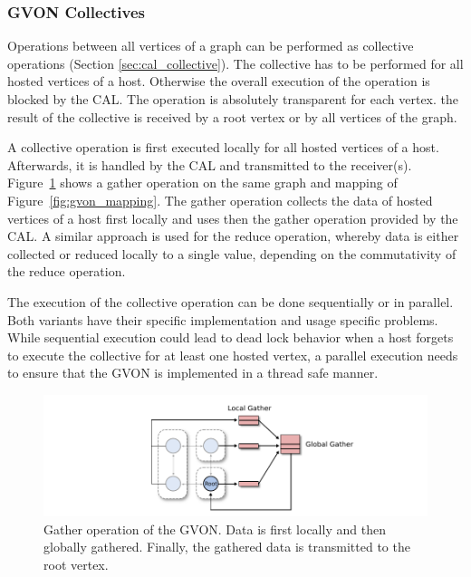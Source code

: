 \subsubsection*{GVON Collectives}
Operations between all vertices of a graph can be performed as
collective operations (Section \ref{sec:cal_collective}).  The
collective has to be performed for all hosted vertices of a
host. Otherwise the overall execution of the operation is blocked by
the CAL. The operation is absolutely transparent for each vertex.  the
result of the collective is received by a root vertex or by all
vertices of the graph.

A collective operation is first executed locally for all hosted
vertices of a host. Afterwards, it is handled by the CAL and
transmitted to the receiver(s). Figure~\ref{fig:gvon_collective} shows
a gather operation on the same graph and mapping of
Figure~\ref{fig:gvon_mapping}. The gather operation collects the data
of hosted vertices of a host first locally and uses then the gather
operation provided by the CAL. A similar approach is used for the
reduce operation, whereby data is either collected or reduced locally
to a single value, depending on the commutativity of the reduce
operation.

The execution of the collective operation can be done sequentially or in
parallel. Both variants have their specific implementation and usage
specific problems. While sequential execution could lead to dead lock behavior
when a host forgets to execute the collective for at least one hosted vertex,
a parallel execution needs to ensure that the GVON is implemented in
a thread safe manner.

\begin{figure}[H]
  \centering \includegraphics[width=\textwidth]{graphics/30_gvon_collective}
  \caption{Gather operation of the GVON. Data is first locally and
    then globally gathered. Finally, the gathered data is transmitted
    to the root vertex.}
  \label{fig:gvon_collective}
\end{figure}


